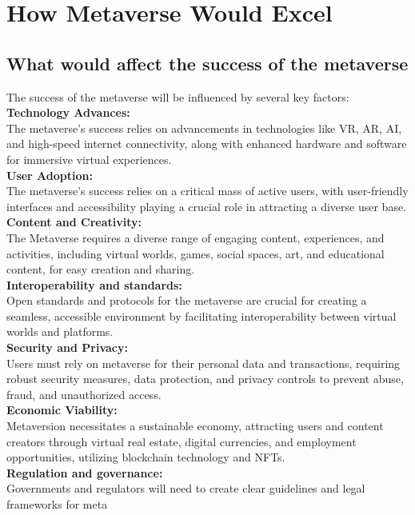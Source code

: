 \section{How Metaverse Would Excel}
\subsection{What would affect the success of the metaverse}
The success of the metaverse will be influenced by several key factors:\\
\textbf{Technology Advances:}\\ The metaverse's success relies on advancements in technologies like VR, AR, AI, and high-speed internet connectivity, along with enhanced hardware and software for immersive virtual experiences.\\
\textbf{User Adoption:}\\ The metaverse's success relies on a critical mass of active users, with user-friendly interfaces and accessibility playing a crucial role in attracting a diverse user base.\\
\textbf{Content and Creativity:}\\ The Metaverse requires a diverse range of engaging content, experiences, and activities, including virtual worlds, games, social spaces, art, and educational content, for easy creation and sharing.\\
\textbf{Interoperability and standards:}\\ Open standards and protocols for the metaverse are crucial for creating a seamless, accessible environment by facilitating interoperability between virtual worlds and platforms.\\
\textbf{Security and Privacy:}\\ Users must rely on metaverse for their personal data and transactions, requiring robust security measures, data protection, and privacy controls to prevent abuse, fraud, and unauthorized access.\\
\textbf{Economic Viability:}\\ Metaversion necessitates a sustainable economy, attracting users and content creators through virtual real estate, digital currencies, and employment opportunities, utilizing blockchain technology and NFTs.\\
\textbf{Regulation and governance:}\\ Governments and regulators will need to create clear guidelines and legal frameworks for meta